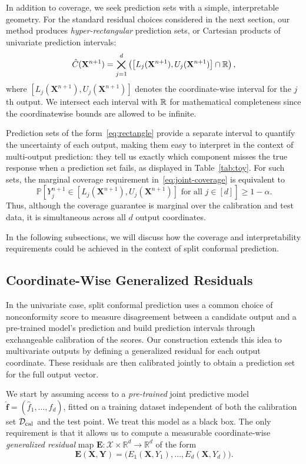 In addition to coverage, we seek prediction sets with a simple, interpretable geometry. For the standard residual choices considered in the next section, our method produces \emph{hyper-rectangular} prediction sets, or Cartesian products of univariate prediction intervals:
\begin{equation}\label{eq:rectangle}
\hat C(\mathbf X^{n+1})
=
\bigtimes_{j=1}^d
\left(
\left[L_j(\mathbf X^{n+1}),U_j(\mathbf X^{n+1})\right]
\cap\mathbb{R}
\right),
\end{equation}
where $[L_j(\mathbf X^{n+1}),U_j(\mathbf X^{n+1})]$ denotes the coordinate-wise interval for the $j$th output. We intersect each interval with $\mathbb{R}$ for mathematical completeness since the coordinatewise bounds are allowed to be infinite.

Prediction sets of the form~\eqref{eq:rectangle} provide a separate interval to quantify the uncertainty of each output, making them easy to interpret in the context of multi-output prediction: they tell us exactly which component misses the true response when a prediction set fails, as displayed in Table~\ref{tab:toy}.
For such sets, the marginal coverage requirement in~\eqref{eq:joint-coverage} is equivalent to
\[
\mathbb P\left[
Y_j^{n+1}\in[L_j(\mathbf X^{n+1}),U_j(\mathbf X^{n+1})]
\text{ for all }j\in[d]
\right]\geq1-\alpha.
\]
Thus, although the coverage guarantee is marginal over the calibration and test data, it is simultaneous across all $d$ output coordinates.

In the following subsections, we will discuss how the coverage and interpretability requirements could be achieved in the context of split conformal prediction.


\subsection{Coordinate-Wise Generalized Residuals}
\label{sec:residuals}

In the univariate case, split conformal prediction uses a common choice of nonconformity score to measure disagreement between a candidate output and a pre-trained model's prediction and build prediction intervals through exchangeable calibration of the scores. Our construction extends this idea to multivariate outputs by defining a generalized residual for each output coordinate. These residuals are then calibrated jointly to obtain a prediction set for the full output vector.

We start by assuming access to a \emph{pre-trained} joint predictive model $\hat{\mathbf f}=(\hat f_1,\ldots,\hat f_d)$, fitted on a training dataset independent of both the calibration set ${\cal D}_{\mathrm{cal}}$ and the test point.
We treat this model as a black box. The only requirement is that it allows us to compute a measurable coordinate-wise \emph{generalized residual} map $\mathbf E:\mathcal X\times\mathbb R^d\to\mathbb R^d$ of the form
\[
\mathbf E(\mathbf X,\mathbf Y)
=
\bigl(E_1(\mathbf X,Y_1),\ldots,E_d(\mathbf X,Y_d)\bigr).
\]

